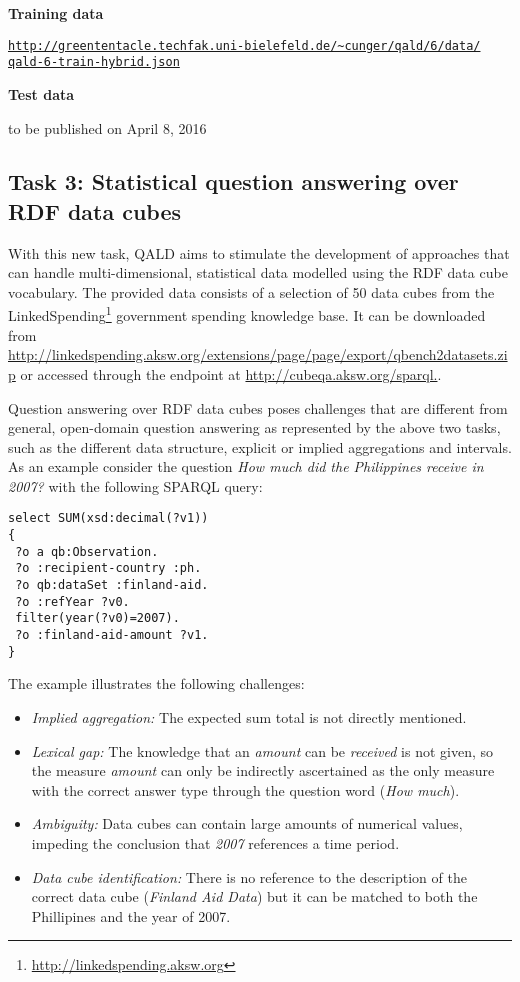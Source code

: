 \textbf{Training data}

\href{http://greententacle.techfak.uni-bielefeld.de/~cunger/qald/6/data/qald-6-train-hybrid.json}{\texttt{http://greententacle.techfak.uni-bielefeld.de/\textasciitilde cunger/qald/6/data/\\qald-6-train-hybrid.json}}

\textbf{Test data}

to be published on April 8, 2016


\subsection{Task 3: Statistical question answering over RDF data cubes}

With this new task, QALD aims to stimulate the development of approaches that can handle multi-dimensional, statistical data modelled using the RDF data cube vocabulary.
The provided data consists of a selection of 50 data cubes from the LinkedSpending\footnote{\url{http://linkedspending.aksw.org}} government spending knowledge base.
It can be downloaded from \url{http://linkedspending.aksw.org/extensions/page/page/export/qbench2datasets.zip}
or accessed through the endpoint at \url{http://cubeqa.aksw.org/sparql.}.

Question answering over RDF data cubes poses challenges that are different from general, open-domain question answering as represented by the above two tasks, such as the different data structure, explicit or implied aggregations and intervals.
As an example consider the question \emph{How much did the Philippines receive in 2007?} with the following SPARQL query:

\begin{lstlisting}
select SUM(xsd:decimal(?v1))
{
 ?o a qb:Observation.
 ?o :recipient-country :ph.
 ?o qb:dataSet :finland-aid.
 ?o :refYear ?v0.
 filter(year(?v0)=2007).
 ?o :finland-aid-amount ?v1.
}
\end{lstlisting}
The example illustrates the following challenges:
\begin{itemize}
\item \emph{Implied aggregation:} The expected sum total is not directly mentioned.
\item \emph{Lexical gap:} The knowledge that an \emph{amount} can be \emph{received} is not given, so the measure \emph{amount} can only be indirectly ascertained as the only measure with the correct answer type through the question word (\emph{How much}).
\item \emph{Ambiguity:} Data cubes can contain large amounts of numerical values, impeding the conclusion that \emph{2007} references a time period.
\item \emph{Data cube identification:} There is no reference to the description of the correct data cube (\emph{Finland Aid Data}) but it can be matched to both the Phillipines and the year of 2007.
\end{itemize}

